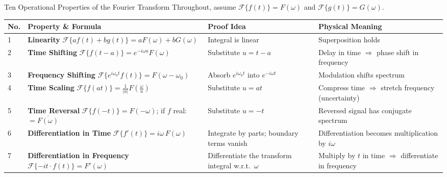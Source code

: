 \documentclass[12pt,a4paper]{article}
\begin{document}
\begin{infobox}{Ten Operational Properties of the Fourier Transform}
Throughout, assume $\mathcal{F}\{f(t)\} = F(\omega)$ and $\mathcal{F}\{g(t)\} = G(\omega)$.

\vspace{0.5em}
\renewcommand{\arraystretch}{1.5}
\begin{tabular}{@{} l p{5.2cm} p{3.5cm} p{3.8cm} @{}}
\toprule
\textbf{No.} & \textbf{Property \& Formula} & \textbf{Proof Idea} & \textbf{Physical Meaning} \\
\midrule
1 & \textbf{Linearity} \newline
    $\mathcal{F}\{af(t)+bg(t)\} = aF(\omega)+bG(\omega)$ &
    Integral is linear & Superposition holds \\

2 & \textbf{Time Shifting} \newline
    $\mathcal{F}\{f(t-a)\} = e^{-i\omega a}F(\omega)$ &
    Substitute $u=t-a$ & Delay in time $\Rightarrow$ phase shift in frequency \\

3 & \textbf{Frequency Shifting} \newline
    $\mathcal{F}\{e^{i\omega_0 t}f(t)\} = F(\omega-\omega_0)$ &
    Absorb $e^{i\omega_0 t}$ into $e^{-i\omega t}$ & Modulation shifts spectrum \\

4 & \textbf{Time Scaling} \newline
    $\mathcal{F}\{f(at)\} = \frac{1}{|a|}F\!\left(\frac{\omega}{a}\right)$ &
    Substitute $u=at$ & Compress time $\Rightarrow$ stretch frequency (uncertainty) \\

5 & \textbf{Time Reversal} \newline
    $\mathcal{F}\{f(-t)\} = F(-\omega)$; if $f$ real: $= \overline{F(\omega)}$ &
    Substitute $u=-t$ & Reversed signal has conjugate spectrum \\

6 & \textbf{Differentiation in Time} \newline
    $\mathcal{F}\{f'(t)\} = i\omega\, F(\omega)$ &
    Integrate by parts; boundary terms vanish &
    Differentiation becomes multiplication by $i\omega$ \\

7 & \textbf{Differentiation in Frequency} \newline
    $\mathcal{F}\{-it\cdot f(t)\} = F'(\omega)$ &
    Differentiate the transform integral w.r.t.\ $\omega$ &
    Multiply by $t$ in time $\Rightarrow$ differentiate in frequency \\


\end{tabular}
\end{infobox}
\end{document}
